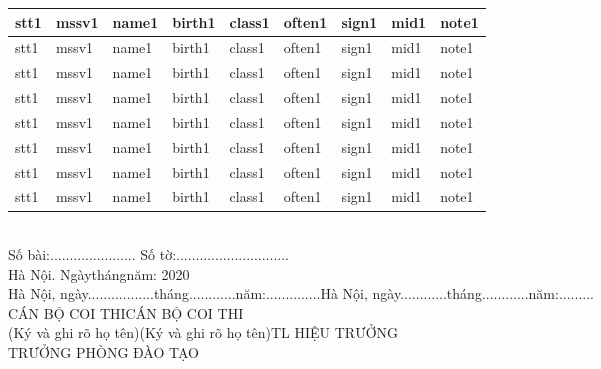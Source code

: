 \documentclass[14pt,a4paper]{article}
\newcommand\tab[1][1cm]{\hspace*{#1}} %
\begin{document}
\begin{tabular}{ m{0.7cm} | m{2cm}| m{4cm} | m{2cm} | m{2.5cm} | m{1.2cm} | m{1.5cm} | m{1cm} | m{1.6cm} | }
	\hline
	stt1 & mssv1 & name1 & birth1 & class1 & often1 & sign1 & mid1 & note1\\
	\hline
	stt1 & mssv1 & name1 & birth1 & class1 & often1 & sign1 & mid1 & note1\\
	\hline
	stt1 & mssv1 & name1 & birth1 & class1 & often1 & sign1 & mid1 & note1\\
	\hline
	stt1 & mssv1 & name1 & birth1 & class1 & often1 & sign1 & mid1 & note1\\
	\hline
	stt1 & mssv1 & name1 & birth1 & class1 & often1 & sign1 & mid1 & note1\\
	\hline
	stt1 & mssv1 & name1 & birth1 & class1 & often1 & sign1 & mid1 & note1\\
	\hline
	stt1 & mssv1 & name1 & birth1 & class1 & often1 & sign1 & mid1 & note1\\
	\hline
	stt1 & mssv1 & name1 & birth1 & class1 & often1 & sign1 & mid1 & note1\\
	\bottomrule[0.4mm]
\end{tabular}\\
\tab[0.7cm]\vspace{-0.4cm}Số bài:...................... Số tờ:.............................\tab\\
\vspace{-0.2cm}\tab[15cm]Hà Nội. Ngày\tab[0.5cm]tháng\tab[0.5cm]năm: 2020\\
\vspace{-0.2cm}Hà Nội, ngày.................tháng............năm:..............\tab[1.25cm]Hà Nội, ngày............tháng............năm:.........\tab[1.25cm]\\
\tab[0.5cm]CÁN BỘ COI THI\vspace{-0.2cm}\tab[5.5cm]CÁN BỘ COI THI\\
\tab[0.4cm](Ký và ghi rõ họ tên)\tab[5.2cm](Ký và ghi rõ họ tên)\tab[5cm]TL HIỆU TRƯỞNG\\
\tab[15.5cm] TRƯỞNG PHÒNG ĐÀO TẠO
\end{document}
